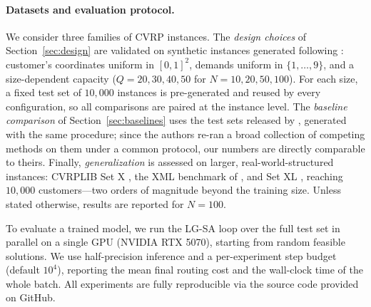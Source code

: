 \documentclass[letterpaper]{article} %
\begin{document}
\paragraph{Datasets and evaluation protocol.}
We consider three families of CVRP instances. The \emph{design choices} of Section~\ref{sec:design} are validated on synthetic instances generated following \citet{nazari_reinforcement_2018}: customer's coordinates uniform in $[0,1]^2$, demands uniform in $\{1,\dots,9\}$, and a size-dependent capacity ($Q = 20, 30, 40, 50$ for $N = 10, 20, 50, 100$). For each size, a fixed test set of $10{,}000$ instances is pre-generated and reused by every configuration, so all comparisons are paired at the instance level. The \emph{baseline comparison} of Section~\ref{sec:baselines} uses the test sets released by \citet{ma_learning_2023}, generated with the same procedure; since the authors re-ran a broad collection of competing methods on them under a common protocol, our numbers are directly comparable to theirs. Finally, \emph{generalization} is assessed on larger, real-world-structured instances: CVRPLIB Set X \citep{uchoa_new_2017}, the XML benchmark of \citet{queiroga_10000_nodate}, and Set XL \citep{queiroga_xl_2026}, reaching $10{,}000$ customers---two orders of magnitude beyond the training size. Unless stated otherwise, results are reported for $N=100$. 

To evaluate a trained model, we run the LG-SA loop over the full test set in parallel on a single GPU (NVIDIA RTX 5070), starting from random feasible solutions. We use half-precision inference and a per-experiment step budget (default $10^4$), reporting the mean final routing cost and the wall-clock time of the whole batch. All experiments are fully reproducible via the source code provided on GitHub.



\end{document}
